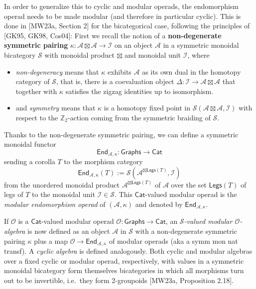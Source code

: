 \documentclass[11pt]{article}
\theoremstyle{definition}
\begin{document}
In order to generalize this to cyclic and modular operads, the endomorphism operad needs to be made modular (and therefore in particular cyclic). This is done in [MW23a, Section 2] for the bicategorical case, following the principles of [GK95, GK98, Cos04]: First we recall the notion of a \textbf{non-degenerate symmetric pairing} $\kappa : \mathcal{A} \boxtimes \mathcal{A} \to \mathcal{I}$ on an object $\mathcal{A}$ in a symmetric monoidal bicategory $\mathcal{S}$ with monoidal product $\boxtimes$ and monoidal unit $\mathcal{I}$, where
\begin{itemize}
    \item \textit{non-degeneracy} means that $\kappa$ exhibits $\mathcal{A}$ as its own dual in the homotopy category of $\mathcal{S}$, that is, there is a coevaluation object $\Delta : \mathcal{I} \to \mathcal{A} \boxtimes \mathcal{A}$ that together with $\kappa$ satisfies the zigzag identities up to isomorphism. 
    \item and \textit{symmetry} means that $\kappa$ is a homotopy fixed point in $\mathcal{S}(\mathcal{A} \boxtimes \mathcal{A}, \mathcal{I})$ with respect to the $\mathbb{Z}_2$-action coming from the symmetric braiding of $\mathcal{S}$.
\end{itemize}
Thanks to the non-degenerate symmetric pairing, we can define a symmetric monoidal functor $$\mathsf{End}_{\mathcal{A}, \kappa}: \mathsf{Graphs} \to \mathsf{Cat}$$ sending a corolla $T$ to the morphism category $$\mathsf{End}_{\mathcal{A}, \kappa}(T):=\mathcal{S}(\mathcal{A}^{\boxtimes \mathsf{Legs}(T)}, \mathcal{I})$$ from the unordered monoidal product $\mathcal{A}^{\boxtimes \mathsf{Legs}(T)}$ of $\mathcal{A}$ over the set $\mathsf{Legs}(T)$ of legs of $T$ to the monoidal unit $\mathcal{I} \in \mathcal{S}$. This $\mathsf{Cat}$-valued modular operad is the \textit{modular endomorphism operad} of $(\mathcal{A}, \kappa)$ and denoted by $\mathsf{End}_{\mathcal{A}, \kappa}$.

If $\mathcal{O}$ is a $\mathsf{Cat}$-valued modular operad $\mathcal{O} :\mathsf{Graphs} \to \mathsf{Cat}$, an \textit{$\mathcal{S}$-valued  modular $\mathcal{O}$-algebra}  is now defined as an object $\mathcal{A}$ in $\mathcal{S}$  with a non-degenerate symmetric pairing $\kappa$ plus a map $\mathcal{O} \to \mathsf{End}_{\mathcal{A}, \kappa}$ of modular operads (aka a symm mon nat transf). A \textit{cyclic algebra} is defined analogously. Both cyclic and modular algebras over a fixed cyclic or modular operad, respectively, with values in a symmetric monoidal bicategory form themselves bicategories in which all morphisms turn out to be invertible, i.e.\ they form 2-groupoids [MW23a, Proposition 2.18].
\end{document}
